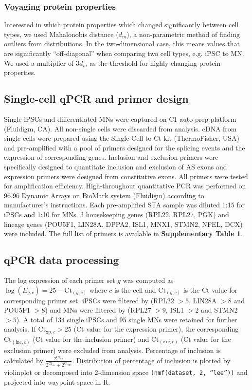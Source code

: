 \subsubsection{Voyaging protein properties}

Interested in which protein properties which changed significantly between cell types, we used Mahalonobis distance\cite{DeMaesschalck:2000hv} ($d_m$), a non-parametric method of finding outliers from distributions. In the two-dimensional case, this means values that are significantly ``off-diagonal'' when comparing two cell types, e.g. iPSC to MN. We used a multiplier of $3d_m$ as the threshold for highly changing protein properties.

\subsection{Single-cell qPCR and primer design}

Single iPSCs and differentiated MNs were captured on C1 auto prep platform (Fluidigm, CA). All non-single cells were discarded from analysis. cDNA from single cells were prepared using the Single-Cell-to-Ct kit (ThermoFisher, USA) and pre-amplified with a pool of primers designed for the splicing events and the expression of corresponding genes. Inclusion and exclusion primers were specifically designed to quantitate inclusion and exclusion of AS exons and expression primers were designed from constitutive exons. All primers were tested for amplification efficiency. High-throughout quantitative PCR was performed on 96.96 Dynamic Arrays on BioMark system (Fluidigm) according to manufacturer's instructions. Each pre-amplified STA sample was diluted 1:15 for iPSCs and 1:10 for MNs. 3 housekeeping genes (RPL22, RPL27, PGK) and lineage genes (POU5F1, LIN28A, DPPA2, ISL1, MNX1, STMN2, NFEL, DCX) were included. The full list of primers is available in \textbf{Supplementary Table 1}.

\subsection{qPCR data processing}

The log expression of each primer set $g$ was computed as $\log(E_{g,c}) = 25 - \mathrm{Ct}_{(g,c)}$ where $c$ is the cell and $\mathrm{Ct}_{(g,c)}$ is the $\mathrm{Ct}$ value for corresponding primer set. iPSCs were filtered by (RPL22 $>5$, LIN28A $> 8$ and POU5F1 $> 8$) and MNs were filtered by (RPL27 $> 9$, ISL1 $> 2$ and STMN2 $> 5$). A total of 134 single iPSCs and 95 single MNs were retained for further analysis. If $\mathrm{Ct}_{\mathrm{xp},c}  > 25$ ($\mathrm{Ct}$ value for the expression primer), the corresponding $\mathrm{Ct}_{(\mathrm{inc},c)}$ ($\mathrm{Ct}$ value for the inclusion primer) and $\mathrm{Ct}_{(\mathrm{exc},c)}$ ($\mathrm{Ct}$ value for the exclusion primer) were excluded from analysis. Percentage of inclusion is calculated by $\frac{2^{\mathrm{Ct}_{\mathrm{inc}}}}{2^{\mathrm{Ct}_{\mathrm{inc}}} +2^{\mathrm{Ct}_{\mathrm{exc}}}}$. Distribution of percentage of inclusion is plotted by violinplot or decomposed into 2-dimension space \texttt{(nmf(dataset, 2, ``lee''))} and projected into waypoint space in R.

